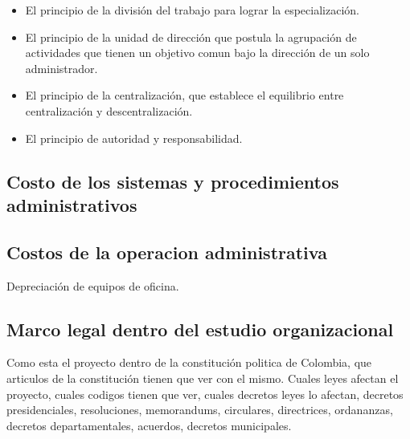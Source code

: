 \documentclass[a4paper, 11pt, oneside]{article}
\begin{document}
\begin{itemize}
	\item El principio de la división del trabajo para lograr la especialización.
	\item El principio de la unidad de dirección que postula la agrupación de actividades que tienen un objetivo comun bajo la dirección
	      de un solo administrador.
	\item El principio de la centralización, que establece el equilibrio entre centralización y descentralización.
	\item El principio de autoridad y responsabilidad.
\end{itemize}

\subsection{Costo de los sistemas y procedimientos administrativos}


\subsection{Costos de la operacion administrativa}

Depreciación de equipos de oficina.

\subsection{Marco legal dentro del estudio organizacional}

Como esta el proyecto dentro de la constitución politica de Colombia, que articulos de la constitución tienen que ver con el mismo. Cuales leyes
afectan el proyecto, cuales codigos tienen que ver, cuales decretos leyes lo afectan, decretos presidenciales, resoluciones, memorandums, circulares,
directrices, ordananzas, decretos departamentales, acuerdos, decretos municipales.
\end{document}
